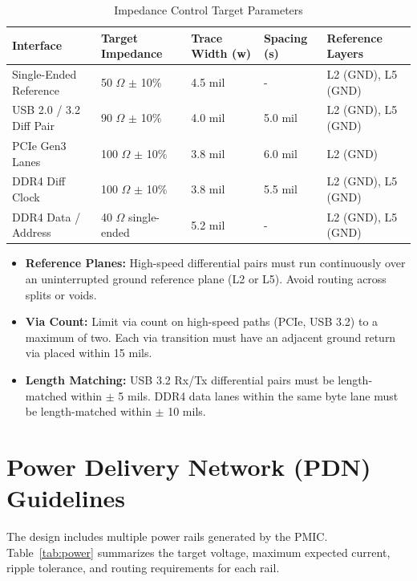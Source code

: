 \documentclass[11pt,a4paper]{article}
\begin{document}
\begin{table}[h]
\centering
\fontsize{9}{11}\selectfont
\begin{tabularx}{\textwidth}{l l l l X}
\rowcolor{primary}
\color{white}\textbf{Interface} & \color{white}\textbf{Target Impedance} & \color{white}\textbf{Trace Width (w)} & \color{white}\textbf{Spacing (s)} & \color{white}\textbf{Reference Layers} \\
\midrule
Single-Ended Reference & 50 $\Omega$ $\pm$ 10\% & 4.5 mil & - & L2 (GND), L5 (GND) \\
\rowcolor{lightbg}
USB 2.0 / 3.2 Diff Pair & 90 $\Omega$ $\pm$ 10\% & 4.0 mil & 5.0 mil & L2 (GND), L5 (GND) \\
PCIe Gen3 Lanes & 100 $\Omega$ $\pm$ 10\% & 3.8 mil & 6.0 mil & L2 (GND) \\
\rowcolor{lightbg}
DDR4 Diff Clock & 100 $\Omega$ $\pm$ 10\% & 3.8 mil & 5.5 mil & L2 (GND), L5 (GND) \\
DDR4 Data / Address & 40 $\Omega$ single-ended & 5.2 mil & - & L2 (GND), L5 (GND) \\
\bottomrule
\end{tabularx}
\caption{Impedance Control Target Parameters}
\label{tab:impedance}
\end{table}

\begin{tcolorbox}[colback=lightbg, colframe=secondary, title=\textbf{\faInfoCircle\ High-Speed Routing Best Practices}]
\fontsize{9}{11}\selectfont
\begin{itemize}[leftmargin=*]
    \item \textbf{Reference Planes:} High-speed differential pairs must run continuously over an uninterrupted ground reference plane (L2 or L5). Avoid routing across splits or voids.
    \item \textbf{Via Count:} Limit via count on high-speed paths (PCIe, USB 3.2) to a maximum of two. Each via transition must have an adjacent ground return via placed within 15 mils.
    \item \textbf{Length Matching:} USB 3.2 Rx/Tx differential pairs must be length-matched within $\pm$ 5 mils. DDR4 data lanes within the same byte lane must be length-matched within $\pm$ 10 mils.
\end{itemize}
\end{tcolorbox}

\section{Power Delivery Network (PDN) Guidelines}
The design includes multiple power rails generated by the PMIC. Table~\ref{tab:power} summarizes the target voltage, maximum expected current, ripple tolerance, and routing requirements for each rail.
\end{document}
